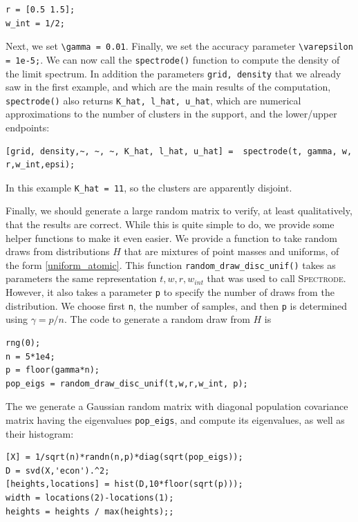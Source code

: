 \documentclass[english,11pt]{article} %
\begin{document}
\begin{verbatim}
r = [0.5 1.5];
w_int = 1/2;
\end{verbatim}

Next, we set \verb+\gamma = 0.01+. Finally, we set the accuracy parameter \verb+\varepsilon = 1e-5;+. We can now call the \verb+spectrode()+ function to compute the density of the limit spectrum. In addition the parameters  \verb+grid, density+ that we already saw in the first example, and which are the main results of the computation,  \verb+spectrode()+ also returns \verb+K_hat, l_hat, u_hat+, which are numerical approximations to the number of clusters in the support, and the lower/upper endpoints:


\begin{verbatim}
[grid, density,~, ~, ~, K_hat, l_hat, u_hat] =  spectrode(t, gamma, w, r,w_int,epsi);
\end{verbatim}

In this example \verb+K_hat = 11+, so the clusters are apparently disjoint. 

Finally, we should generate a large random matrix to verify, at least qualitatively, that the results are correct. While this is quite simple to do, we provide some helper functions to make it even easier. We provide a function to take random draws from distributions $H$ that are mixtures of point masses and uniforms, of the form \ref{uniform_atomic}. This function \verb+random_draw_disc_unif()+ takes as parameters the same representation $t,w,r,w_{int}$ that was used to call \textsc{Spectrode}. However, it also takes a parameter \verb+p+ to specify the number of draws from the distribution. We choose first \verb+n+, the number of samples, and then \verb+p+ is determined using $\gamma = p/n$. The code to generate a random draw from $H$ is

\begin{verbatim}
rng(0);
n = 5*1e4;
p = floor(gamma*n);
pop_eigs = random_draw_disc_unif(t,w,r,w_int, p);
\end{verbatim}

The we generate a Gaussian random matrix with diagonal population covariance matrix having the eigenvalues \verb+pop_eigs+, and compute its eigenvalues, as well as their histogram:  

\begin{verbatim}
[X] = 1/sqrt(n)*randn(n,p)*diag(sqrt(pop_eigs));
D = svd(X,'econ').^2;
[heights,locations] = hist(D,10*floor(sqrt(p)));
width = locations(2)-locations(1);
heights = heights / max(heights);;
\end{verbatim}
\end{document}
